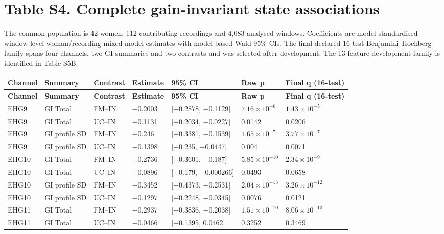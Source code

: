 \documentclass[10pt]{article}
\begin{document}
\section*{Table S4. Complete gain-invariant state associations}\label{tab:s4_gi_associations}
The common population is 42 women, 112 contributing recordings and 4,083 analysed windows. Coefficients are model-standardised window-level woman/recording mixed-model estimates with model-based Wald 95\% CIs. The final declared 16-test Benjamini--Hochberg family spans four channels, two GI summaries and two contrasts and was selected after development. The 13-feature development family is identified in Table S5B.
\begin{longtable}{p{1.5cm}p{2.5cm}p{2.4cm}p{1.4cm}p{3.2cm}p{1.8cm}p{2.0cm}}
\toprule
\textbf{Channel} & \textbf{Summary} & \textbf{Contrast} & \textbf{Estimate} & \textbf{95\% CI} & \textbf{Raw p} & \textbf{Final q (16-test)} \\
\midrule
\endfirsthead
\toprule
\textbf{Channel} & \textbf{Summary} & \textbf{Contrast} & \textbf{Estimate} & \textbf{95\% CI} & \textbf{Raw p} & \textbf{Final q (16-test)} \\
\midrule
\endhead
EHG9 & GI Total & FM--IN & $-$0.2003 & [$-$0.2878, $-$0.1129] & $7.16\times10^{-6}$ & $1.43\times10^{-5}$ \\
EHG9 & GI Total & UC--IN & $-$0.1131 & [$-$0.2034, $-$0.0227] & 0.0142 & 0.0206 \\
EHG9 & GI profile SD & FM--IN & $-$0.246 & [$-$0.3381, $-$0.1539] & $1.65\times10^{-7}$ & $3.77\times10^{-7}$ \\
EHG9 & GI profile SD & UC--IN & $-$0.1398 & [$-$0.235, $-$0.0447] & 0.004 & 0.0071 \\
EHG10 & GI Total & FM--IN & $-$0.2736 & [$-$0.3601, $-$0.187] & $5.85\times10^{-10}$ & $2.34\times10^{-9}$ \\
EHG10 & GI Total & UC--IN & $-$0.0896 & [$-$0.179, $-$0.000266] & 0.0493 & 0.0658 \\
EHG10 & GI profile SD & FM--IN & $-$0.3452 & [$-$0.4373, $-$0.2531] & $2.04\times10^{-13}$ & $3.26\times10^{-12}$ \\
EHG10 & GI profile SD & UC--IN & $-$0.1297 & [$-$0.2248, $-$0.0345] & 0.0076 & 0.0121 \\
EHG11 & GI Total & FM--IN & $-$0.2937 & [$-$0.3836, $-$0.2038] & $1.51\times10^{-10}$ & $8.06\times10^{-10}$ \\
EHG11 & GI Total & UC--IN & $-$0.0466 & [$-$0.1395, 0.0462] & 0.3252 & 0.3469 \\

\end{longtable}
\end{document}
